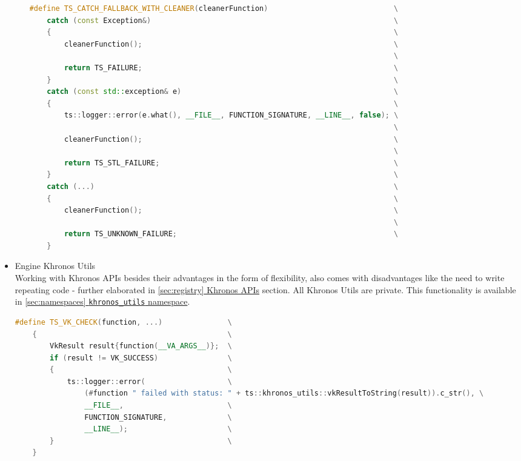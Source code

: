 \begin{itemize}
\begin{itemize}
\begin{lstlisting}[language=c++, caption=Private Engine Utils (./engine/src/internal\_utils.h)]
#define TS_CATCH_FALLBACK_WITH_CLEANER(cleanerFunction)                             \
    catch (const Exception&)                                                        \
    {                                                                               \
        cleanerFunction();                                                          \
                                                                                    \
        return TS_FAILURE;                                                          \
    }                                                                               \
    catch (const std::exception& e)                                                 \
    {                                                                               \
        ts::logger::error(e.what(), __FILE__, FUNCTION_SIGNATURE, __LINE__, false); \
                                                                                    \
        cleanerFunction();                                                          \
                                                                                    \
        return TS_STL_FAILURE;                                                      \
    }                                                                               \
    catch (...)                                                                     \
    {                                                                               \
        cleanerFunction();                                                          \
                                                                                    \
        return TS_UNKNOWN_FAILURE;                                                  \
    }
\end{lstlisting}
    \end{itemize}
    \item Engine Khronos Utils\\
    \label{sec:khronos_utils}
    Working with Khronos APIs besides their advantages in the form of flexibility, also comes with disadvantages like the need to write repeating code - further elaborated in \hyperref[sec:registry]{\ref*{sec:registry} Khronos APIs} section. All Khronos Utils are private.
    This functionality is available in \hyperref[sec:namespaces]{\ref*{sec:namespaces} \texttt{khronos\_utils} namespace}.
\begin{lstlisting}[language=c++, caption=Khronos Utils (./engine/src/khronos\_utils.h)]
#define TS_VK_CHECK(function, ...)               \
    {                                            \
        VkResult result{function(__VA_ARGS__)};  \
        if (result != VK_SUCCESS)                \
        {                                        \
            ts::logger::error(                   \
                (#function " failed with status: " + ts::khronos_utils::vkResultToString(result)).c_str(), \
                __FILE__,                        \
                FUNCTION_SIGNATURE,              \
                __LINE__);                       \
        }                                        \
    }


\end{lstlisting}
\end{itemize}
